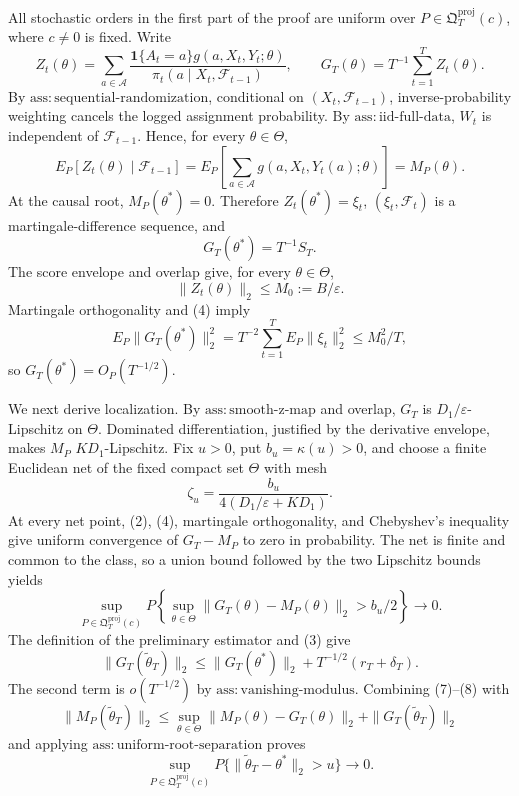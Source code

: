 All stochastic orders in the first part of the proof are uniform over \(P\in\mathfrak Q_T^{\mathrm{proj}}(c)\), where \(c\ne0\) is fixed. Write
\[
 Z_t(\theta)=\sum_{a\in\mathcal A}
 \frac{\mathbf1\{A_t=a\}g(a,X_t,Y_t;\theta)}
 {\pi_t(a\mid X_t,\mathcal F_{t-1})},
 \qquad G_T(\theta)=T^{-1}\sum_{t=1}^TZ_t(\theta).
\tag{1}
\]
By \(\mathrm{ass:sequential\text{-}randomization}\), conditional on \((X_t,\mathcal F_{t-1})\), inverse-probability weighting cancels the logged assignment probability. By \(\mathrm{ass:iid\text{-}full\text{-}data}\), \(W_t\) is independent of \(\mathcal F_{t-1}\). Hence, for every \(\theta\in\Theta\),
\[
 E_P[Z_t(\theta)\mid\mathcal F_{t-1}]
 =E_P\!\left[\sum_{a\in\mathcal A}g(a,X_t,Y_t(a);\theta)\right]
 =M_P(\theta).
\tag{2}
\]
At the causal root, \(M_P(\theta^*)=0\). Therefore \(Z_t(\theta^*)=\xi_t\), \((\xi_t,\mathcal F_t)\) is a martingale-difference sequence, and
\[
 G_T(\theta^*)=T^{-1}S_T.
\tag{3}
\]
The score envelope and overlap give, for every \(\theta\in\Theta\),
\[
 \|Z_t(\theta)\|_2\le M_0:=B/\varepsilon.
\tag{4}
\]
Martingale orthogonality and (4) imply
\[
 E_P\|G_T(\theta^*)\|_2^2
 =T^{-2}\sum_{t=1}^TE_P\|\xi_t\|_2^2
 \le M_0^2/T,
\tag{5}
\]
so \(G_T(\theta^*)=O_P(T^{-1/2})\).

We next derive localization. By \(\mathrm{ass:smooth\text{-}z\text{-}map}\) and overlap, \(G_T\) is \(D_1/\varepsilon\)-Lipschitz on \(\Theta\). Dominated differentiation, justified by the derivative envelope, makes \(M_P\) \(KD_1\)-Lipschitz. Fix \(u>0\), put \(b_u=\kappa(u)>0\), and choose a finite Euclidean net of the fixed compact set \(\Theta\) with mesh
\[
 \zeta_u=\frac{b_u}{4(D_1/\varepsilon+KD_1)}.
\tag{6}
\]
At every net point, (2), (4), martingale orthogonality, and Chebyshev's inequality give uniform convergence of \(G_T-M_P\) to zero in probability. The net is finite and common to the class, so a union bound followed by the two Lipschitz bounds yields
\[
 \sup_{P\in\mathfrak Q_T^{\mathrm{proj}}(c)}P\!\left\{
 \sup_{\theta\in\Theta}\|G_T(\theta)-M_P(\theta)\|_2>b_u/2
 \right\}\longrightarrow0.
\tag{7}
\]
The definition of the preliminary estimator and (3) give
\[
 \|G_T(\widetilde\theta_T)\|_2
 \le \|G_T(\theta^*)\|_2+T^{-1/2}(r_T+\delta_T).
\tag{8}
\]
The second term is \(o(T^{-1/2})\) by \(\mathrm{ass:vanishing\text{-}modulus}\). Combining (7)--(8) with
\[
 \|M_P(\widetilde\theta_T)\|_2
 \le \sup_{\theta\in\Theta}\|M_P(\theta)-G_T(\theta)\|_2
 +\|G_T(\widetilde\theta_T)\|_2
\tag{9}
\]
and applying \(\mathrm{ass:uniform\text{-}root\text{-}separation}\) proves
\[
 \sup_{P\in\mathfrak Q_T^{\mathrm{proj}}(c)}
 P\{\|\widetilde\theta_T-\theta^*\|_2>u\}\longrightarrow0.
\tag{10}
\]

